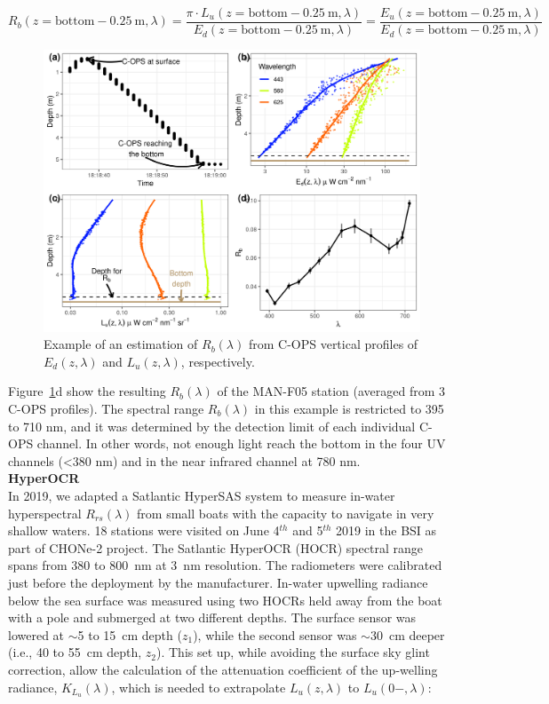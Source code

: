 \documentclass[essd, manuscript]{copernicus}
\begin{document}
\begin{equation}
    R_b(z = \mathrm{bottom-0.25~m}, \lambda) = \frac{\pi \cdot L_u(z = \mathrm{bottom-0.25~m}, \lambda)}{E_d(z = \mathrm{bottom-0.25~m}, \lambda)} = \frac{E_u(z = \mathrm{bottom-0.25~m}, \lambda)}{E_d(z = \mathrm{bottom-0.25~m}, \lambda)}
\end{equation}

\begin{figure}
    \centering
    \includegraphics[width=18cm]{Figures/Fig_Rb_v2.png}
    \caption{Example of an estimation of $R_b(\lambda)$  from C-OPS vertical profiles of $E_d(z,\lambda)$ and $L_u(z,\lambda)$, respectively.   }
    \label{fig:Rb}
\end{figure}
Figure~\ref{fig:Rb}d show the resulting $R_b(\lambda)$ of the MAN-F05 station (averaged from 3 C-OPS profiles). The spectral range $R_b(\lambda)$ in this example is restricted to 395 to 710 nm, and it was determined by the detection limit of each individual C-OPS channel. In other words, not enough light reach the bottom in the four UV channels (<380 nm) and in the near infrared channel at 780 nm.\\       

\textbf{HyperOCR}\\
In 2019, we adapted a Satlantic HyperSAS system to measure in-water hyperspectral $R_{rs}(\lambda)$ from small boats with the capacity to navigate in very shallow waters. 18 stations were visited on June 4$^{th}$ and 5$^{th}$ 2019 in the BSI as part of CHONe-2 project. The Satlantic HyperOCR (HOCR) spectral range spans from 380 to 800~nm at 3~nm resolution. The radiometers were calibrated just before the deployment by the manufacturer. In-water upwelling radiance below the sea surface was measured using two HOCRs held away from the boat with a pole and submerged at two different depths. The surface sensor was lowered at $\sim$5 to 15~cm depth ($z_1$), while the second sensor was $\sim$30~cm deeper (i.e., 40 to 55~cm depth, $z_2$). This set up, while avoiding the surface sky glint correction, allow the calculation of the attenuation coefficient of the up-welling radiance, $K_{L_u}(\lambda)$,  which is needed to extrapolate $L_u(z,\lambda)$ to  $L_u(0-,\lambda)$: 
\end{document}
